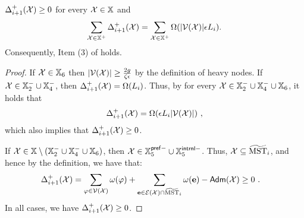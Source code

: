 \begin{lemma}\label{lm:Item3Clustering}   $\Delta_{i+1}^+(\mathcal{X}) \geq 0$ for every $\mathcal{X} \in \mathbb{X}$ and 
	\begin{equation*}
		\sum_{\mathcal{X} \in \mathbb{X}^{+}} \Delta_{i+1}^+(\mathcal{X}) = \sum_{\mathcal{X} \in\mathbb{X}^{+}} \Omega(|\mathcal{V}(\mathcal{X})|\epsilon L_i). 
	\end{equation*}
Consequently, Item (3) of  holds.
\end{lemma}
\begin{proof}
If $\mathcal{X} \in \mathbb{X}_6$ then $|\mathcal{V}(\mathcal{X})|\geq \frac{2g}{\zeta \epsilon}$ by the definition of heavy nodes. If $\mathcal{X} \in \mathbb{X}^{-}_2\cup \mathbb{X}^{-}_4$, then $\Delta^+_{i+1}(\mathcal{X}) = \Omega(L_i)$. Thus, by  for every $\mathcal{X} \in \mathbb{X}^{-}_2\cup \mathbb{X}^{-}_4 \cup \mathbb{X}_6$, it holds that 	
	\begin{equation} \label{eq:Delta-246}
		\Delta^+_{i+1}(\mathcal{X}) = \Omega(\epsilon L_i |\mathcal{V}(\mathcal{X})|)~,
	\end{equation}
which also implies that  $	\Delta^+_{i+1}(\mathcal{X}) \geq 0$. 

If $\mathcal{X} \in \mathbb{X}\setminus (\mathbb{X}^{-}_2\cup \mathbb{X}^{-}_4 \cup \mathbb{X}_6)$, then $\mathcal{X} \in \mathbb{X}_5^{\mathsf{pref}-}\cup \mathbb{X}_5^{\mathsf{intrnl}-}$. Thus, $\mathcal{X} \subseteq \widetilde{\mathrm{MST}}_{i}$, and hence by the definition, we have that:
	\begin{equation*}
	\begin{split}
		\Delta^+_{i+1}(\mathcal{X}) &=  \sum_{\varphi \in \mathcal{V}(\mathcal{X})}\omega(\varphi) + \sum_{\mathbf{e} \in \mathcal{E}(\mathcal{X})\cap \widetilde{\mathrm{MST}}_{i}}\omega(\mathbf{e}) -  \mathsf{Adm}(\mathcal{X}) \geq 0~.
	\end{split}
\end{equation*}
In all cases, we have $\Delta^+_{i+1}(\mathcal{X})\geq 0$.



\end{proof}

